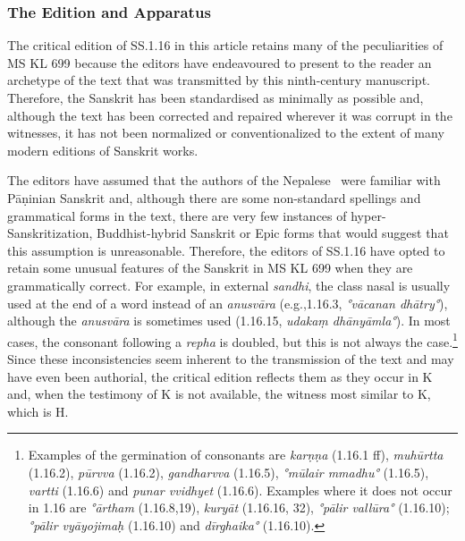 \subsubsection{The Edition and Apparatus}
The critical edition of SS.1.16 in this article retains many of the peculiarities of MS KL 699 because the editors have endeavoured to present to the reader an archetype of the text that was transmitted by this ninth-century manuscript. Therefore, the Sanskrit has been standardised as minimally as possible and, although the text has been corrected and repaired wherever it was corrupt in the witnesses, it has not been normalized or conventionalized to the extent of many modern editions of Sanskrit works. 

The editors have assumed that the authors of the Nepalese \SS\ were familiar with Pāṇinian Sanskrit and, although there are some non-standard spellings and grammatical forms in the text, there are very few instances of hyper-Sanskritization, Buddhist-hybrid Sanskrit or Epic forms that would suggest that this assumption is unreasonable. Therefore, the editors of SS.1.16 have opted to retain some unusual features of the Sanskrit in MS KL 699 when they are grammatically correct. For example, in external \emph{sandhi}, the class nasal is usually used at the end of a word instead of an \emph{anusvāra} (e.g.,1.16.3, \emph{°vācanan dhātry°}), although the \emph{anusvāra} is sometimes used (1.16.15, \emph{udakaṃ dhānyāmla°}). In most cases, the consonant following a \emph{repha} is doubled, but this is not always the case.\footnote{Examples of the germination of consonants are \emph{karṇṇa} (1.16.1 ff), \emph{muhūrtta} (1.16.2), \emph{pūrvva} (1.16.2), \emph{gandharvva} (1.16.5), \emph{°mūlair mmadhu°} (1.16.5), \emph{vartti} (1.16.6) and \emph{punar vvidhyet} (1.16.6). Examples where it does not occur in 1.16 are  \emph{°ārtham} (1.16.8,19), \emph{kuryāt} (1.16.16, 32), \emph{°pālir vallūra°} (1.16.10); \emph{°pālir vyāyojimaḥ} (1.16.10) and \emph{dīrghaika°} (1.16.10).} Since these inconsistencies seem inherent to the transmission of the text and may have even been authorial, the critical edition reflects them as they occur in K and, when the testimony of K is not available, the witness most similar to K, which is H.




